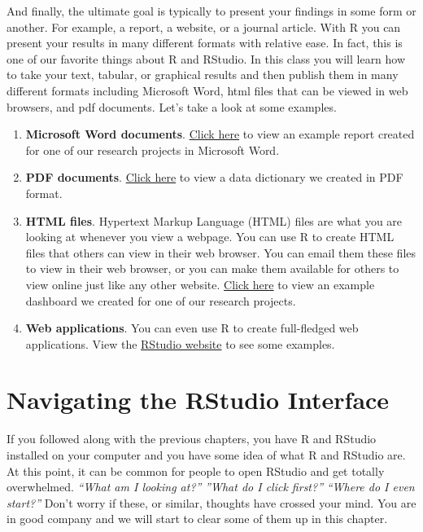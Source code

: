 \documentclass[
  letterpaper,
  DIV=11,
  numbers=noendperiod]{scrreprt}
\providecommand{\tightlist}{%
  \setlength{\itemsep}{0pt}\setlength{\parskip}{0pt}}\usepackage{longtable,booktabs,array}
\begin{document}
And finally, the ultimate goal is typically to present your findings in
some form or another. For example, a report, a website, or a journal
article. With R you can present your results in many different formats
with relative ease. In fact, this is one of our favorite things about R
and RStudio. In this class you will learn how to take your text,
tabular, or graphical results and then publish them in many different
formats including Microsoft Word, html files that can be viewed in web
browsers, and pdf documents. Let's take a look at some examples.

\begin{enumerate}
\def\labelenumi{\arabic{enumi}.}
\tightlist
\item
  \textbf{Microsoft Word documents}.
  \href{https://www.dropbox.com/s/6l1ikp6wbyue9bd/chap_2_example_word_docI.docx?dl=0}{Click
  here} to view an example report created for one of our research
  projects in Microsoft Word.\\
\item
  \textbf{PDF documents}.
  \href{https://www.dropbox.com/s/hheuyv5qcabf197/chap_2_example_pdf.pdf?dl=0}{Click
  here} to view a data dictionary we created in PDF format.\\
\item
  \textbf{HTML files}. Hypertext Markup Language (HTML) files are what
  you are looking at whenever you view a webpage. You can use R to
  create HTML files that others can view in their web browser. You can
  email them these files to view in their web browser, or you can make
  them available for others to view online just like any other website.
  \href{https://brad-cannell.github.io/detect_recruitment_dashboard/}{Click
  here} to view an example dashboard we created for one of our research
  projects.\\
\item
  \textbf{Web applications}. You can even use R to create full-fledged
  web applications. View the
  \href{https://shiny.rstudio.com/gallery/}{RStudio website} to see some
  examples.
\end{enumerate}

\chapter{Navigating the RStudio
Interface}\label{navigating-the-rstudio-interface}

If you followed along with the previous chapters, you have R and RStudio
installed on your computer and you have some idea of what R and RStudio
are. At this point, it can be common for people to open RStudio and get
totally overwhelmed. \emph{``What am I looking at?''} \emph{''What do I
click first?''} \emph{``Where do I even start?''} Don't worry if these,
or similar, thoughts have crossed your mind. You are in good company and
we will start to clear some of them up in this chapter.
\end{document}
